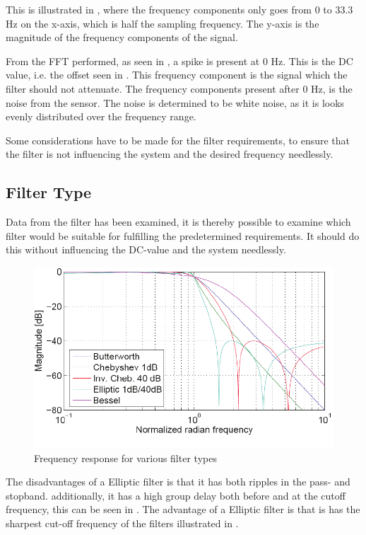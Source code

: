 This is illustrated in , where the frequency components only goes from 0 to 33.3 Hz on the x-axis, which is half the sampling frequency. The y-axis is the magnitude of the frequency components of the signal.

From the FFT performed, as seen in , a spike is present at 0 \si{Hz}. This is the DC value, i.e. the offset seen in . This frequency component is the signal which the filter should not attenuate. The frequency components present after 0 Hz, is the noise from the sensor. The noise is determined to be white noise, as it is looks evenly distributed over the frequency range.

Some considerations have to be made for the filter requirements, to ensure that the filter is not influencing the system and the desired frequency needlessly.

\subsection{Filter Type}
Data from the filter has been examined, it is thereby possible to examine which filter would be suitable for fulfilling the predetermined requirements. It should do this without influencing the DC-value and the system needlessly.

\begin{figure}[H]
	\centering
	\includegraphics[scale=1]{figures/Filtertypes1.pdf}
	\caption{Frequency response for various filter types}
	\label{fig:Filtertype1}
\end{figure}

The disadvantages of a Elliptic filter is that it has both ripples in the pass- and stopband. additionally, it has a high group delay both before and at the cutoff frequency, this can be seen in . The advantage of a Elliptic filter is that is has the sharpest cut-off frequency of the filters illustrated in .


